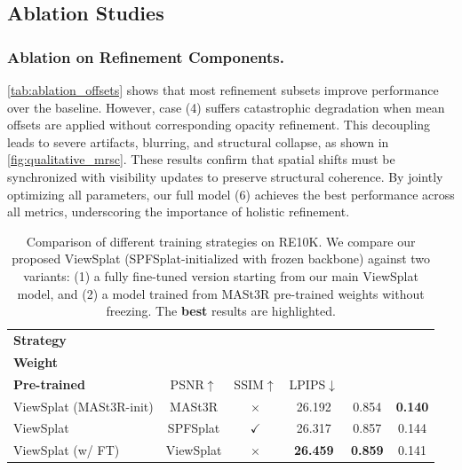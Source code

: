 \documentclass[runningheads]{llncs}
\begin{document}
\vspace{-0.3cm}
\subsection{Ablation Studies}
\vspace{-0.2cm}
\subsubsection{Ablation on Refinement Components.}
\cref{tab:ablation_offsets} shows that most refinement subsets improve performance over the baseline. However, case (4) suffers catastrophic degradation when mean offsets are applied without corresponding opacity refinement. This decoupling leads to severe artifacts, blurring, and structural collapse, as shown in \cref{fig:qualitative_mrsc}. These results confirm that spatial shifts must be synchronized with visibility updates to preserve structural coherence. By jointly optimizing all parameters, our full model (6) achieves the best performance across all metrics, underscoring the importance of holistic refinement.

\begin{table}
    \centering
\caption{Comparison of different training strategies on RE10K. We compare our proposed ViewSplat (SPFSplat-initialized with frozen backbone) against two variants: (1) a fully fine-tuned version starting from our main ViewSplat model, and (2) a model trained from MASt3R pre-trained weights without freezing. The \textbf{best} results are highlighted.}
\label{tab:ablation_trainconfig}
\vspace{-0.2cm}

\setlength{\tabcolsep}{5pt}
\begin{scriptsize}
    \begin{tabular}{l c c ccc}
        \toprule
        \textbf{Strategy} & \makecell{\textbf{Pre-trained} \\ \textbf{Weight}} & \makecell{\textbf{Freeze} \\ \textbf{Pre-trained}} & PSNR$\uparrow$ & SSIM$\uparrow$ & LPIPS$\downarrow$ \\ \midrule
        ViewSplat (MASt3R-init) & MASt3R & $\times$ & 26.192 & 0.854 & \textbf{0.140} \\
        ViewSplat & SPFSplat & $\checkmark$ & 26.317 & 0.857 & 0.144 \\
        ViewSplat (w/ FT) & ViewSplat & $\times$ & \textbf{26.459} & \textbf{0.859} & 0.141 \\ \bottomrule
    \end{tabular}
\end{scriptsize}
\end{table}
\end{document}
